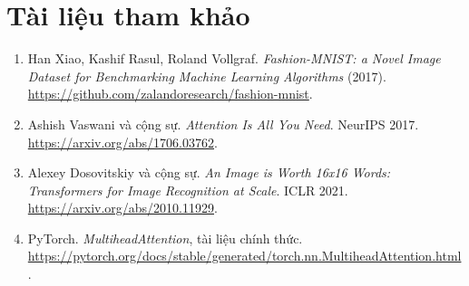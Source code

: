 \documentclass[12pt,a4paper]{article}
\begin{document}
\clearpage
\section*{Tài liệu tham khảo}

\begin{enumerate}
\item[{[1]}] Han Xiao, Kashif Rasul, Roland Vollgraf. \textit{Fashion-MNIST: a
Novel Image Dataset for Benchmarking Machine Learning Algorithms} (2017).
\url{https://github.com/zalandoresearch/fashion-mnist}.
\item[{[2]}] Ashish Vaswani và cộng sự. \textit{Attention Is All You Need}.
NeurIPS 2017. \url{https://arxiv.org/abs/1706.03762}.
\item[{[3]}] Alexey Dosovitskiy và cộng sự. \textit{An Image is Worth 16x16
Words: Transformers for Image Recognition at Scale}. ICLR 2021.
\url{https://arxiv.org/abs/2010.11929}.
\item[{[4]}] PyTorch. \textit{MultiheadAttention}, tài liệu chính thức.
\url{https://pytorch.org/docs/stable/generated/torch.nn.MultiheadAttention.html}.
\end{enumerate}
\end{document}
